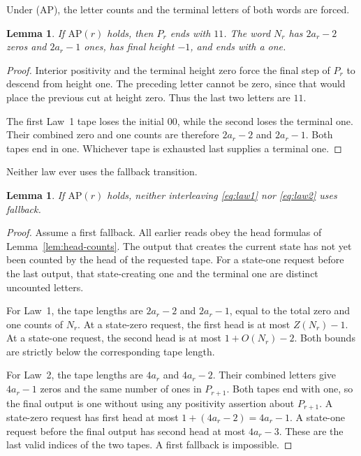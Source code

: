 \documentclass[11pt]{article}
\newtheorem{lemma}[theorem]{Lemma}
\theoremstyle{definition}
\theoremstyle{remark}
\begin{document}
Under (AP), the letter counts and the terminal letters of both words are forced.
\begin{lemma}
\label{lem:terminal-counts}
If \(\mathrm{AP}(r)\) holds, then \(P_r\) ends with \(11\).  The word
\(N_r\) has \(2a_r-2\) zeros and \(2a_r-1\) ones, has final height \(-1\),
and ends with a one.
\end{lemma}

\begin{proof}
Interior positivity and the terminal height zero force the final step of
\(P_r\) to descend from height one.  The preceding letter cannot be zero,
since that would place the previous cut at height zero.  Thus the last two
letters are \(11\).

The first Law~1 tape loses the initial \(00\), while the second loses the
terminal one.  Their combined zero and one counts are therefore
\(2a_r-2\) and \(2a_r-1\).  Both tapes end in one.  Whichever tape is
exhausted last supplies a terminal one.
\end{proof}

Neither law ever uses the fallback transition.
\begin{lemma}

If \(\mathrm{AP}(r)\) holds, neither interleaving
\eqref{eq:law1} nor \eqref{eq:law2} uses fallback.
\end{lemma}

\begin{proof}
Assume a first fallback.  All earlier reads obey the head formulas of
Lemma~\ref{lem:head-counts}.  The output that creates the current state has
not yet been counted by the head of the requested tape.  For a state-one
request before the last output, that state-creating one and the terminal one
are distinct uncounted letters.

For Law~1, the tape lengths are \(2a_r-2\) and \(2a_r-1\), equal to the
total zero and one counts of \(N_r\).  At a state-zero request, the first head
is at most \(Z(N_r)-1\).  At a state-one request, the second head is at most
\(1+O(N_r)-2\).  Both bounds are strictly below the corresponding tape
length.

For Law~2, the tape lengths are \(4a_r\) and \(4a_r-2\).  Their combined
letters give \(4a_r-1\) zeros and the same number of ones in \(P_{r+1}\).
Both tapes end with one, so the final output is one without using any
positivity assertion about \(P_{r+1}\).  A state-zero request has first head
at most \(1+(4a_r-2)=4a_r-1\).  A state-one request before the final output
has second head at most \(4a_r-3\).  These are the last valid indices of the
two tapes.  A first fallback is impossible.
\end{proof}
\end{document}
